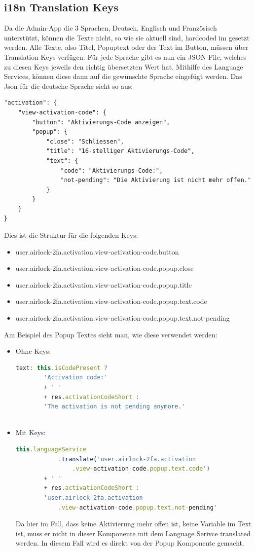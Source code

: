 \subsection{i18n Translation Keys}
Da die Admin-App die 3 Sprachen, Deutsch, Englisch und Französisch unterstützt, können die Texte nicht, so wie sie aktuell sind, hardcoded im gesetzt werden. Alle Texte, also Titel, Popuptext oder der Text im Button, müssen über Translation Keys verfügen. Für jede Sprache gibt es nun ein JSON-File, welches zu diesen Keys jeweils den richtig übersetzten Wert hat. Mithilfe des Language Services, können diese dann auf die gewünschte Sprache eingefügt werden. Das Json für die deutsche Sprache sieht so aus:
\begin{verbatim}
"activation": {
	"view-activation-code": {
		"button": "Aktivierungs-Code anzeigen",
		"popup": {
			"close": "Schliessen",
			"title": "16-stelliger Aktivierungs-Code",
			"text": {
				"code": "Aktivierungs-Code:",
				"not-pending": "Die Aktivierung ist nicht mehr offen."
			}
		}
	}
}
\end{verbatim}
Dies ist die Struktur für die folgenden Keys:
\begin{itemize}
	\item user.airlock-2fa.activation.view-activation-code.button
	\item user.airlock-2fa.activation.view-activation-code.popup.close
	\item user.airlock-2fa.activation.view-activation-code.popup.title
	\item user.airlock-2fa.activation.view-activation-code.popup.text.code
	\item user.airlock-2fa.activation.view-activation-code.popup.text.not-pending
\end{itemize}
Am Beispiel des Popup Textes sieht man, wie diese verwendet werden:
\begin{itemize}
	\item Ohne Keys:
	\begin{lstlisting}[language=TypeScript]
		text: this.isCodePresent ? 
		'Activation code:'
		+ ' '
		+ res.activationCodeShort :
		'The activation is not pending anymore.'
		
	\end{lstlisting}
	\item Mit Keys:
	\begin{lstlisting}[language=TypeScript]
        this.languageService
        	.translate('user.airlock-2fa.activation
        		.view-activation-code.popup.text.code')
		+ ' '
		+ res.activationCodeShort :
		'user.airlock-2fa.activation
			.view-activation-code.popup.text.not-pending'
	\end{lstlisting}
	Da hier im Fall, dass keine Aktivierung mehr offen ist, keine Variable im Text ist, muss er nicht in dieser Komponente mit dem Language Serivce translated werden. In diesem Fall wird es direkt von der Popup Komponente gemacht.	
\end{itemize}
